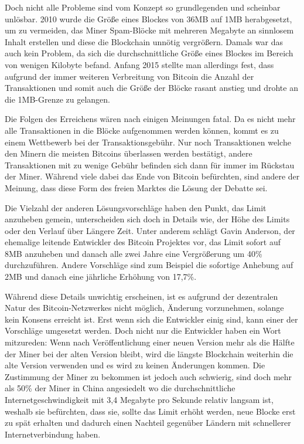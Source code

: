 Doch nicht alle Probleme sind vom Konzept so grundlegenden und scheinbar unlösbar.
2010 wurde die Größe eines Blockes von 36MB auf 1MB herabgesetzt, um zu vermeiden, das Miner Spam-Blöcke mit mehreren Megabyte an sinnlosem Inhalt erstellen und diese die Blockchain unnötig vergrößern.
Damals war das auch kein Problem, da sich die durchschnittliche Größe eines Blockes im Bereich von wenigen Kilobyte befand.
Anfang 2015 stellte man allerdings fest, dass aufgrund der immer weiteren Verbreitung von Bitcoin die Anzahl der Transaktionen und somit auch die Größe der Blöcke rasant anstieg und drohte an die 1MB-Grenze zu gelangen.

Die Folgen des Erreichens wären nach einigen Meinungen fatal.
Da es nicht mehr alle Transaktionen in die Blöcke aufgenommen werden können, kommt es zu einem Wettbewerb bei der Transaktionsgebühr.
Nur noch Transaktionen welche den Minern die meisten Bitcoins überlassen werden bestätigt, andere Transaktionen mit zu wenige Gebühr befinden sich dann für immer im Rückstau der Miner.
Während viele dabei das Ende von Bitcoin befürchten, sind andere der Meinung, dass diese Form des freien Marktes die Lösung der Debatte sei.

Die Vielzahl der anderen Lösungsvorschläge haben den Punkt, das Limit anzuheben gemein, unterscheiden sich doch in Details wie, der Höhe des Limits oder den Verlauf über Längere Zeit.
Unter anderem schlägt Gavin Anderson, der ehemalige leitende Entwickler des Bitcoin Projektes vor, das Limit sofort auf 8MB anzuheben und danach alle zwei Jahre eine Vergrößerung um 40\% durchzuführen.
Andere Vorschläge sind zum Beispiel die sofortige Anhebung auf 2MB und danach eine jährliche Erhöhung von 17,7\%.

Während diese Details unwichtig erscheinen, ist es aufgrund der dezentralen Natur des Bitcoin-Netzwerkes nicht möglich, Änderung vorzunehmen, solange kein Konsens erreicht ist.
Erst wenn sich die Entwickler einig sind, kann einer der Vorschläge umgesetzt werden.
Doch nicht nur die Entwickler haben ein Wort mitzureden:
Wenn nach Veröffentlichung einer neuen Version mehr als die Hälfte der Miner bei der alten Version bleibt, wird die längste Blockchain weiterhin die alte Version verwenden und es wird zu keinen Änderungen kommen.
Die Zustimmung der Miner zu bekommen ist jedoch auch schwierig, sind doch mehr als 50\% der Miner in China angesiedelt wo die durchschnittliche Internetgeschwindigkeit mit 3,4 Megabyte pro Sekunde  relativ langsam ist, weshalb sie befürchten, dass sie, sollte das Limit erhöht werden, neue Blocke erst zu spät erhalten und dadurch einen Nachteil gegenüber Ländern mit schnellerer Internetverbindung haben.

